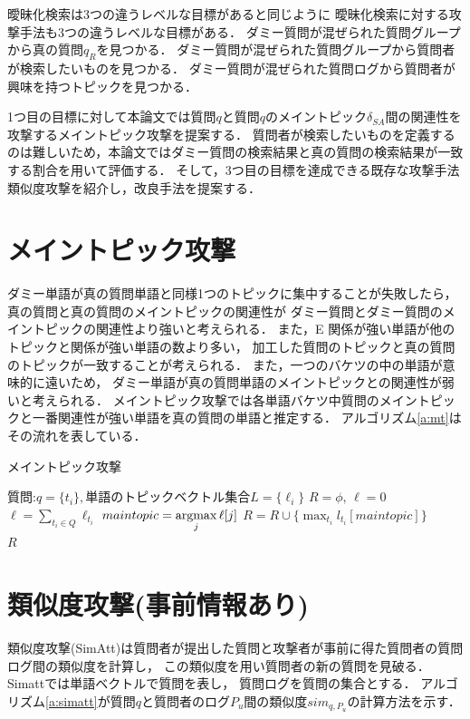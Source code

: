 \documentclass[master]{suribt}
\theoremstyle{definition}
\newcommand{\argmax}{\mathop{\rm argmax}\limits}
\begin{document}
 曖昧化検索は3つの違うレベルな目標があると同じように
 曖昧化検索に対する攻撃手法も3つの違うレベルな目標がある．
 ダミー質問が混ぜられた質問グループから真の質問$q_R$を見つかる．
 ダミー質問が混ぜられた質問グループから質問者が検索したいものを見つかる．
 ダミー質問が混ぜられた質問ログから質問者が興味を持つトピックを見つかる．

 1つ目の目標に対して本論文では質問$q$と質問$q$のメイントピック$\delta_{SA}$間の関連性を攻撃するメイントピック攻撃を提案する．
 質問者が検索したいものを定義するのは難しいため，本論文ではダミー質問の検索結果と真の質問の検索結果が一致する割合を用いて評価する．
 そして，3つ目の目標を達成できる既存な攻撃手法類似度攻撃\cite{simattack2016}を紹介し，改良手法を提案する．

 \section{メイントピック攻撃}

 ダミー単語が真の質問単語と同様1つのトピックに集中することが失敗したら，
 真の質問と真の質問のメイントピックの関連性が
 ダミー質問とダミー質問のメイントピックの関連性より強いと考えられる．
 また，E
 関係が強い単語が他のトピックと関係が強い単語の数より多い，
 加工した質問のトピックと真の質問のトピックが一致することが考えられる．
 また，一つのバケツの中の単語が意味的に遠いため，
 ダミー単語が真の質問単語のメイントピックとの関連性が弱いと考えられる．
 メイントピック攻撃では各単語バケツ中質問のメイントピックと一番関連性が強い単語を真の質問の単語と推定する．
 アルゴリズム\ref{a:mt}はその流れを表している．

 \begin{algorithm}
 \caption{メイントピック攻撃}
 \begin{algorithmic}[1]
  \Require 質問:$q=\{t_i\},$単語のトピックベクトル集合$L=\{\ell_i\}$
  \State $R=\phi, \, \ell=0$
  \State $\ell=\sum_{t_i \in Q}\ell_{t_i}$
  \State $maintopic = \argmax_j \ell[j]$
  \State $R=R \cup \{\max_{t_i}l_{t_i}[maintopic]\}$
  \EndFor　\\
  \Return $R$
 \end{algorithmic}
 \label{a:mt}
 \end{algorithm}

 \section{類似度攻撃(事前情報あり)}
 類似度攻撃(SimAtt)\cite{simattack2016}は質問者が提出した質問と攻撃者が事前に得た質問者の質問ログ間の類似度を計算し，
 この類似度を用い質問者の新の質問を見破る．
 Simattでは単語ベクトルで質問を表し，
 質問ログを質問の集合とする．
 アルゴリズム\ref{a:simatt}が質問$q$と質問者のログ$P_u$間の類似度$sim_{q,P_u}$の計算方法を示す．
\end{document}
